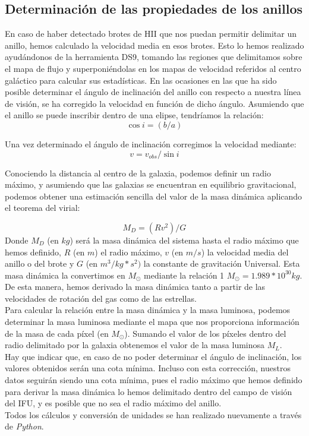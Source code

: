 \documentclass{article}
\begin{document}
\subsection{Determinación de las propiedades de los anillos}
En caso de haber detectado brotes de HII que nos puedan permitir delimitar un anillo, hemos calculado la velocidad media en esos brotes. Esto lo hemos realizado ayudándonos de la herramienta DS9, tomando las regiones que delimitamos sobre el mapa de flujo y superponiéndolas en los mapas de velocidad referidos al centro galáctico para calcular sus estadísticas. 
En las ocasiones en las que ha sido posible determinar el ángulo de inclinación del anillo con respecto a nuestra línea de visión, se ha corregido la velocidad en función de dicho ángulo. Asumiendo que el anillo se puede inscribir dentro de una elipse, tendríamos la relación:
\begin{equation}
\cos i=(b/a) \label{ecuacion_2}
\end{equation}

Una vez determinado el ángulo de inclinación corregimos la velocidad mediante:
\begin{equation}
v=v_{obs}/\sin i \label{ecuacion_3}
\end{equation}

Conociendo la distancia al centro de la galaxia, podemos definir un radio máximo, y asumiendo que las galaxias se encuentran en equilibrio gravitacional, podemos obtener una estimación sencilla del valor de la masa dinámica aplicando el teorema del virial:

\begin{equation}
M_{D}=(Rv^{2})/G \label{ecuacion_4}
\end{equation}
Donde $M_{D}$ (en $kg$) será la masa dinámica del sistema hasta el radio máximo que hemos definido, $R$ (en $m$) el radio máximo, $v$ (en $m/s$) la velocidad media del anillo o del brote y $G$ (en $m^{3}/kg*s^{2})$ la constante de gravitación Universal. Esta masa dinámica la convertimos en $M_{\odot}$ mediante la relación 1 $M_{\odot} = 1.989 * 10^{30} kg$.
De esta manera, hemos derivado la masa dinámica tanto a partir de las velocidades de rotación del gas como de las estrellas.\\Para calcular la relación entre la masa dinámica y la masa luminosa, podemos determinar la masa luminosa mediante el mapa que nos proporciona información de la masa de cada píxel (en $M_{\odot}$). Sumando el valor de los píxeles dentro del radio delimitado por la galaxia obtenemos el valor de la masa luminosa $M_{L}$.\\Hay que indicar que, en caso de no poder determinar el ángulo de inclinación, los valores obtenidos serán una cota mínima. Incluso con esta corrección, nuestros datos seguirán siendo una cota mínima, pues el radio máximo que hemos definido para derivar la masa dinámica lo hemos delimitado dentro del campo de visión del IFU, y es posible que no sea el radio máximo del anillo.\\ Todos los cálculos y conversión de unidades se han realizado nuevamente a través de \emph{Python}.
\end{document}
